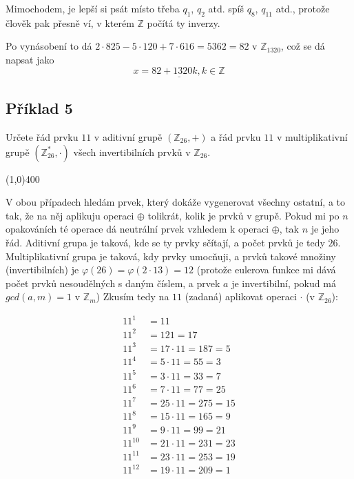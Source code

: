 \documentclass{article}
\begin{document}
Mimochodem, je lepší si psát místo třeba $q_1$, $q_2$ atd. spíš $q_8$, $q_{11}$ atd., protože člověk pak přesně ví, v kterém $\mathbb{Z}$ počítá ty inverzy.

Po vynásobení to dá $2\cdot 825 - 5\cdot 120 + 7\cdot 616 = 5362 = 82$ v $\mathbb{Z}_{1320}$, což se dá napsat jako $$\underline{x = 82 + 1320k, k \in \mathbb{Z}}$$

\subsection{\label{priklad1-5}Příklad 5}
Určete řád prvku $11$ v aditivní grupě $(\mathbb{Z}_{26},+)$ a řád prvku $11$ v multiplikativní grupě $(\mathbb{Z}_{26}^{*},\cdot)$ všech invertibilních prvků v $\mathbb{Z}_{26}$.

\line(1,0){400}

V obou případech hledám prvek, který dokáže vygenerovat všechny ostatní, a to tak, že na něj aplikuju operaci $\oplus$ tolikrát, kolik je prvků v grupě. Pokud mi po $n$ opakováních té operace dá neutrální prvek vzhledem k operaci $\oplus$, tak $n$ je jeho řád. Aditivní grupa je taková, kde se ty prvky sčítají, a počet prvků je tedy $26$. Multiplikativní grupa je taková, kdy prvky umocňuji, a prvků takové množiny (invertibilních) je $\varphi(26) = \varphi(2 \cdot 13) = 12$ (protože eulerova funkce mi dává počet prvků nesoudělných s daným číslem, a prvek $a$ je invertibilní, pokud má $gcd(a, m) = 1$ v $\mathbb{Z}_m$) Zkusím tedy na $11$ (zadaná) aplikovat operaci $\cdot$ (v $\mathbb{Z}_{26}$):

\begin{align*}
11^1 & = 11\\
11^2 & = 121 = 17\\
11^3 & = 17\cdot 11 = 187 = 5\\
11^4 & = 5\cdot 11 = 55 = 3\\
11^5 & = 3\cdot 11 = 33 = 7\\
11^6 & = 7\cdot 11 = 77 = 25\\
11^7 & = 25\cdot 11 = 275 = 15\\
11^8 & = 15\cdot 11 = 165 = 9\\
11^9 & = 9\cdot 11 = 99 = 21\\
11^{10} & = 21\cdot 11 = 231 = 23\\
11^{11} & = 23\cdot 11 = 253 = 19\\
11^{12} & = 19\cdot 11 = 209 = 1\\
\end{align*}
\end{document}
